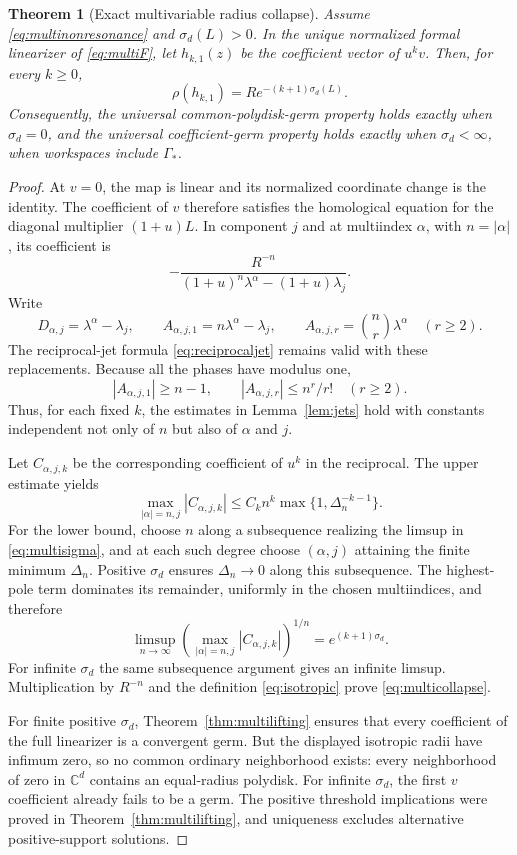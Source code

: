 \documentclass[11pt,a4paper]{article}
\numberwithin{equation}{section}
\newtheorem{theorem}{Theorem}[section]
\theoremstyle{definition}
\theoremstyle{remark}
\newcommand{\C}{\mathbb C}
\newcommand{\Gstar}{\Gamma_*}
\begin{document}
\begin{theorem}[Exact multivariable radius collapse]\label{thm:multicollapse}
Assume \eqref{eq:multinonresonance} and $\sigma_d(L)>0$. In the unique
normalized formal linearizer of \eqref{eq:multiF}, let $h_{k,1}(z)$ be
the coefficient vector of $u^kv$. Then, for every $k\ge0$,
\begin{equation}\label{eq:multicollapse}
 \rho(h_{k,1})=R e^{-(k+1)\sigma_d(L)}.
\end{equation}
Consequently, the universal common-polydisk-germ property holds exactly
when $\sigma_d=0$, and the universal coefficient-germ property holds
exactly when $\sigma_d<\infty$, when workspaces include $\Gstar$.
\end{theorem}

\begin{proof}
At $v=0$, the map is linear and its normalized coordinate change is the
identity. The coefficient of $v$ therefore satisfies the homological
equation for the diagonal multiplier $(1+u)L$. In component $j$ and
at multiindex $\alpha$, with $n=|\alpha|$, its coefficient is
\[
 -\frac{R^{-n}}{(1+u)^n\lambda^\alpha-(1+u)\lambda_j}.
\]
Write
\[
 D_{\alpha,j}=\lambda^\alpha-\lambda_j,
 \qquad
 A_{\alpha,j,1}=n\lambda^\alpha-\lambda_j,
 \qquad
 A_{\alpha,j,r}=\binom nr\lambda^\alpha\quad(r\ge2).
\]
The reciprocal-jet formula \eqref{eq:reciprocaljet} remains valid with
these replacements. Because all the phases have modulus one,
\[
 |A_{\alpha,j,1}|\ge n-1,
 \qquad |A_{\alpha,j,r}|\le n^r/r!\quad(r\ge2).
\]
Thus, for each fixed $k$, the estimates in Lemma~\ref{lem:jets} hold
with constants independent not only of $n$ but also of $\alpha$ and $j$.

Let $C_{\alpha,j,k}$ be the corresponding coefficient of $u^k$ in the
reciprocal. The upper estimate yields
\[
 \max_{|\alpha|=n,j}|C_{\alpha,j,k}|
 \le C_k n^k\max\{1,\Delta_n^{-k-1}\}.
\]
For the lower bound, choose $n$ along a subsequence realizing the
limsup in \eqref{eq:multisigma}, and at each such degree choose
$(\alpha,j)$ attaining the finite minimum $\Delta_n$. Positive
$\sigma_d$ ensures $\Delta_n\to0$ along this subsequence.
The highest-pole term dominates its remainder, uniformly in the chosen
multiindices, and therefore
\[
 \limsup_{n\to\infty}
 \left(\max_{|\alpha|=n,j}|C_{\alpha,j,k}|\right)^{1/n}
       =e^{(k+1)\sigma_d}.
\]
For infinite $\sigma_d$ the same subsequence argument gives an infinite
limsup. Multiplication by $R^{-n}$ and the definition
\eqref{eq:isotropic} prove \eqref{eq:multicollapse}.

For finite positive $\sigma_d$, Theorem~\ref{thm:multilifting} ensures
that every coefficient of the full linearizer is a convergent germ.
But the displayed isotropic radii have infimum zero, so no common
ordinary neighborhood exists: every neighborhood of zero in $\C^d$
contains an equal-radius polydisk. For infinite $\sigma_d$, the first
$v$ coefficient already fails to be a germ. The positive threshold
implications were proved in Theorem~\ref{thm:multilifting}, and uniqueness
excludes alternative positive-support solutions.
\end{proof}
\end{document}

